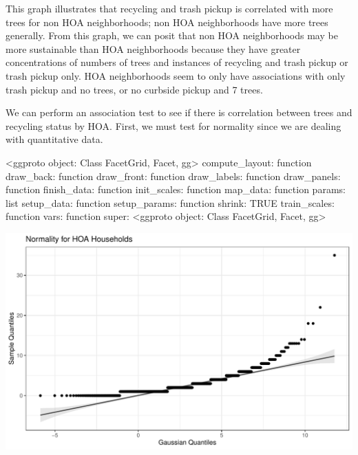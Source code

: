 \documentclass{article}
\begin{document}
This graph illustrates that recycling and trash pickup is correlated with more trees for non HOA neighborhoods; non HOA neighborhoods have more trees generally. From this graph, we can posit that non HOA neighborhoods may be more sustainable than HOA neighborhoods because they have greater concentrations of numbers of trees and instances of recycling and trash pickup or trash pickup only. HOA neighborhoods seem to only have associations with only trash pickup and no trees, or no curbside pickup and 7 trees.

We can perform an association test to see if there is correlation between trees and recycling status by HOA. First, we must test for normality since we are dealing with quantitative data.  
\newline
\begin{Schunk}
\begin{Soutput}
<ggproto object: Class FacetGrid, Facet, gg>
    compute_layout: function
    draw_back: function
    draw_front: function
    draw_labels: function
    draw_panels: function
    finish_data: function
    init_scales: function
    map_data: function
    params: list
    setup_data: function
    setup_params: function
    shrink: TRUE
    train_scales: function
    vars: function
    super:  <ggproto object: Class FacetGrid, Facet, gg>
\end{Soutput}
\end{Schunk}
\includegraphics{exam22-031}
\end{document}
